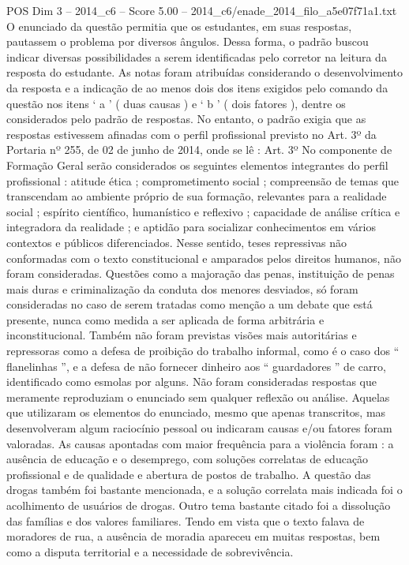 \begin{textsample}{POS Dim 3 – 2014\_c6 – Score 5.00 – 2014\_c6/enade\_2014\_filo\_a5e07f71a1.txt}
O enunciado da questão permitia que os estudantes, em suas respostas, pautassem o problema por diversos ângulos.
Dessa forma, o padrão buscou indicar diversas possibilidades a serem identificadas pelo corretor na leitura da resposta do estudante.
As notas foram atribuídas considerando o desenvolvimento da resposta e a indicação de ao menos dois dos itens exigidos pelo comando da questão nos itens ‘ a ’ ( duas causas ) e ‘ b ’ ( dois fatores ), dentre os considerados pelo padrão de respostas.
No entanto, o padrão exigia que as respostas estivessem afinadas com o perfil profissional previsto no Art. 3º da Portaria nº 255, de 02 de junho de 2014, onde se lê : Art. 3º No componente de Formação Geral serão considerados os seguintes elementos integrantes do perfil profissional : atitude ética ; comprometimento social ; compreensão de temas que transcendam ao ambiente próprio de sua formação, relevantes para a realidade social ; espírito científico, humanístico e reflexivo ; capacidade de análise crítica e integradora da realidade ; e aptidão para socializar conhecimentos em vários contextos e públicos diferenciados.
Nesse sentido, teses repressivas não conformadas com o texto constitucional e amparados pelos direitos humanos, não foram consideradas.
Questões como a majoração das penas, instituição de penas mais duras e criminalização da conduta dos menores desviados, só foram consideradas no caso de serem tratadas como menção a um debate que está presente, nunca como medida a ser aplicada de forma arbitrária e inconstitucional.
Também não foram previstas visões mais autoritárias e repressoras como a defesa de proibição do trabalho informal, como é o caso dos “ flanelinhas ”, e a defesa de não fornecer dinheiro aos “ guardadores ” de carro, identificado como esmolas por alguns.
Não foram consideradas respostas que meramente reproduziam o enunciado sem qualquer reflexão ou análise.
Aquelas que utilizaram os elementos do enunciado, mesmo que apenas transcritos, mas desenvolveram algum raciocínio pessoal ou indicaram causas e/ou fatores foram valoradas.
As causas apontadas com maior frequência para a violência foram : a ausência de educação e o desemprego, com soluções correlatas de educação profissional e de qualidade e abertura de postos de trabalho.
A questão das drogas também foi bastante mencionada, e a solução correlata mais indicada foi o acolhimento de usuários de drogas.
Outro tema bastante citado foi a dissolução das famílias e dos valores familiares.
Tendo em vista que o texto falava de moradores de rua, a ausência de moradia apareceu em muitas respostas, bem como a disputa territorial e a necessidade de sobrevivência.

\end{textsample}
